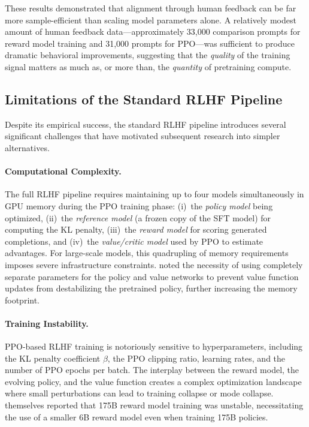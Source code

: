 These results demonstrated that alignment through human feedback can be far more sample-efficient than scaling model parameters alone. A relatively modest amount of human feedback data---approximately 33,000 comparison prompts for reward model training and 31,000 prompts for PPO---was sufficient to produce dramatic behavioral improvements, suggesting that the \emph{quality} of the training signal matters as much as, or more than, the \emph{quantity} of pretraining compute.

\subsection{Limitations of the Standard RLHF Pipeline}

Despite its empirical success, the standard RLHF pipeline introduces several significant challenges that have motivated subsequent research into simpler alternatives.

\paragraph{Computational Complexity.}
The full RLHF pipeline requires maintaining up to four models simultaneously in GPU memory during the PPO training phase: (i)~the \emph{policy model} being optimized, (ii)~the \emph{reference model} (a frozen copy of the SFT model) for computing the KL penalty, (iii)~the \emph{reward model} for scoring generated completions, and (iv)~the \emph{value/critic model} used by PPO to estimate advantages. For large-scale models, this quadrupling of memory requirements imposes severe infrastructure constraints. \cite{stiennon2020learning} noted the necessity of using completely separate parameters for the policy and value networks to prevent value function updates from destabilizing the pretrained policy, further increasing the memory footprint.

\paragraph{Training Instability.}
PPO-based RLHF training is notoriously sensitive to hyperparameters, including the KL penalty coefficient $\beta$, the PPO clipping ratio, learning rates, and the number of PPO epochs per batch. The interplay between the reward model, the evolving policy, and the value function creates a complex optimization landscape where small perturbations can lead to training collapse or mode collapse. \cite{ouyang2022instructgpt} themselves reported that 175B reward model training was unstable, necessitating the use of a smaller 6B reward model even when training 175B policies.

